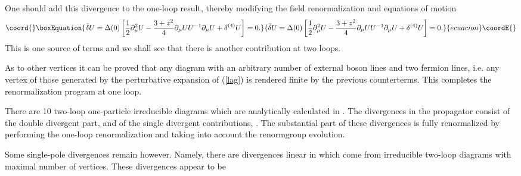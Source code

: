 \documentclass[a4paper,12pt]{article}
\begin{document}
One should  add 
this divergence to the one-loop result, thereby 
modifying the 
\coordHE{} field renormalization and equations of motion
\begin{equation}\coord{}\boxEquation{
\bar\delta U = \Delta(0) \left[\frac12 \partial^2_{\mu} U - 
\frac{3 + z^2}{4}\partial_\mu U U^{-1}\partial_\mu U + \delta^{(4)}U\right]= 0.
\label{eom4}
}{
\bar\delta U = \Delta(0) \left[\frac12 \partial^2_{\mu} U - 
\frac{3 + z^2}{4}\partial_\mu U U^{-1}\partial_\mu U + \delta^{(4)}U\right]= 0.
}{ecuacion}\coordE{}\end{equation}
This is one source of \coordHE{} terms and we shall
see that there is another contribution at two loops.

As to other vertices it can be proved \cite{aabe} that
 any diagram with an arbitrary number of external
boson lines and two fermion lines, i.e. any vertex of those generated by the
perturbative expansion of
(\ref{lag}) is rendered finite by the previous counterterms. This completes
the renormalization program at one loop.

There are 10 two-loop one-particle irreducible diagrams which are 
analytically calculated 
in \cite{aabe}.
The divergences in the propagator consist of the double divergent
part, 
\coordHE{} and of
the single divergent contributions,  
\coordHE{}. The substantial part of these divergences is fully 
renormalized by performing the one-loop renormalization and taking into
account the renormgroup evolution.

Some single-pole divergences remain however. Namely, there are 
 divergences linear in
 \coordHE{} which come from irreducible two-loop
diagrams with maximal number of vertices.
These  divergences appear to be\\
\end{document}
